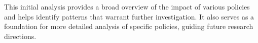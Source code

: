 This initial analysis provides a broad overview of the impact of various policies and
helps identify patterns that warrant further investigation.
It also serves as a foundation for more detailed analysis of specific policies, guiding future research directions.

\begin{figure}[htbp]
    \centering
    \hfill
    \\
\end{figure}
